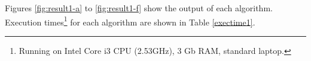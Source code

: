 \documentclass{ipol}
\numberwithin{equation}{section}
\numberwithin{table}{section}
\numberwithin{figure}{section}
\begin{document}
Figures \ref{fig:result1-a} to \ref{fig:result1-f} show the output of each algorithm. Execution times\footnote{Running on Intel Core i3 CPU (2.53GHz), 3 Gb RAM, standard laptop.} for each algorithm are shown in Table \ref{exectime1}. \\

\begin{figure}[h!]
	\centering
	\quad
	\quad


\end{figure}
\end{document}
